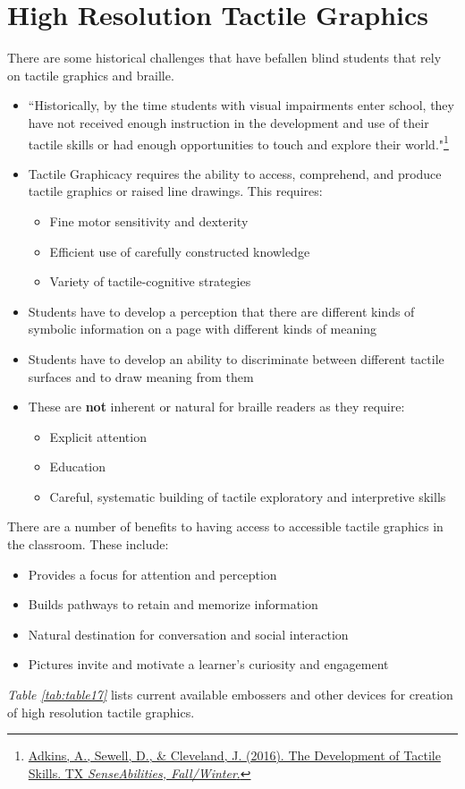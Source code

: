 \pagebreak
\hypertarget{tactile-graphics-high-resolution-complex-graphics}{}\section{High Resolution Tactile Graphics}\label{tactile-graphics-high-resolution-complex-graphics}
There are some historical challenges that have befallen blind students that rely on tactile graphics and braille.
\begin{itemize}[leftmargin=*]
 \item ``Historically, by the time students with visual impairments enter school, they have not received enough instruction in the development and use of their tactile skills or had enough opportunities to touch and explore their world."\footnote{\raggedright \href{http://www.tsbvi.edu/tx-senseabilities/issues/fall-winter-2016/the-development-of-tactile-skills}{Adkins, A., Sewell, D., \& Cleveland, J. (2016). The Development of Tactile Skills. TX \textit{SenseAbilities, Fall/Winter}.}}
 \item Tactile Graphicacy requires the ability to access, comprehend, and produce tactile graphics or raised line drawings. This requires:\begin{itemize}
 \item Fine motor sensitivity and dexterity
 \item Efficient use of carefully constructed knowledge
 \item Variety of tactile-cognitive strategies
\end{itemize}
\item Students have to develop a perception that there are different kinds of symbolic information on a page with different kinds of meaning
\item Students have to develop an ability to discriminate between different tactile surfaces and to draw meaning from them
\item These are \textbf{not} inherent or natural for braille readers as they require:
\begin{itemize}
 \item Explicit attention
 \item Education
 \item Careful, systematic building of tactile exploratory and interpretive skills
\end{itemize}

\end{itemize}

There are a number of benefits to having access to accessible tactile graphics in the classroom. These include:
\begin{itemize}[leftmargin=*]
 \item Provides a focus for attention and perception
 \item Builds pathways to retain and memorize information
 \item Natural destination for conversation and social interaction
 \item Pictures invite and motivate a learner's curiosity and engagement
\end{itemize}
\textit{Table \ref{tab:table17}} lists current available embossers and other devices for creation of high resolution tactile graphics.



